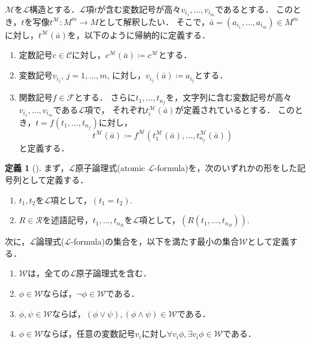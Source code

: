 \documentclass[uplatex, dvipdfmx]{jsarticle}
\numberwithin{equation}{section}
\newcommand{\map}[3]{{#1}\colon{#2}\rightarrow{#3}}
\theoremstyle{definition}
\newtheorem{definition}{定義}[section]
\begin{document}
$\mathcal{M}$を$\mathcal{L}$構造とする．$\mathcal{L}$項$t$が含む変数記号が高々$v_{i_1}, \dots, v_{i_m}$であるとする．
このとき，$t$を写像$\map{t^\mathcal{M}}{M^m}{M}$として解釈したい．
そこで，$\bar{a} = (a_{i_1}, \dots, a_{i_m}) \in M^m$に対し，$t^\mathcal{M}(\bar{a})$を，以下のように帰納的に定義する．

\begin{enumerate}
     \item 定数記号$c \in \mathcal{C}$に対し，$c^\mathcal{M}(\bar{a}) \coloneqq c^\mathcal{M}$とする．
     \item 変数記号$v_{i_j}$, $j=1, \dots, m$, に対し，$v_{i_j}(\bar{a}) \coloneqq a_{i_j}$とする．
     \item 
     関数記号$f \in \mathcal{F}$とする．
     さらに$t_1, \dots, t_{n_f}$を，文字列に含む変数記号が高々$v_{i_1}, \dots, v_{i_m}$である$\mathcal{L}$項で，
     それぞれ$t_i^\mathcal{M}(\bar{a})$が定義されているとする．
     このとき，$t = f(t_1, \dots, t_{n_f})$に対し，
     \begin{equation}
          t^\mathcal{M}(\bar{a})\coloneqq f^\mathcal{M}(t_1^\mathcal{M}(\bar{a}), \dots, t_{n_f}^\mathcal{M}(\bar{a}))
     \end{equation}
     と定義する．
\end{enumerate}

\begin{definition}[{\cite[Definition 1.1.5]{MR1924282}}]
     まず，$\mathcal{L}$原子論理式(atomic $\mathcal{L}$-formula)を，次のいずれかの形をした記号列として定義する．
     \begin{enumerate}
          \item $t_1, t_2$を$\mathcal{L}$項として，$(t_1 = t_2)$.
          \item $R \in \mathcal{R}$を述語記号，$t_1, \dots, t_{n_R}$を$\mathcal{L}$項として，$(R(t_1, \dots, t_{n_R}))$.
     \end{enumerate}
     次に，$\mathcal{L}$論理式($\mathcal{L}$-formula)の集合を，以下を満たす最小の集合$\mathcal{W}$として定義する．
     \begin{enumerate}
          \item $\mathcal{W}$は，全ての$\mathcal{L}原子論理式$を含む．
          \item $\phi \in \mathcal{W}$ならば，$\lnot \phi \in \mathcal{W}$である．
          \item $\phi, \psi \in \mathcal{W}$ならば，$(\phi \lor \psi), (\phi \land \psi) \in \mathcal{W}$である．
          \item $\phi \in \mathcal{W}$ならば，任意の変数記号$v_i$に対し$\forall v_i \phi, \exists v_i \phi \in \mathcal{W}$である．
     \end{enumerate}
\end{definition}
\end{document}
